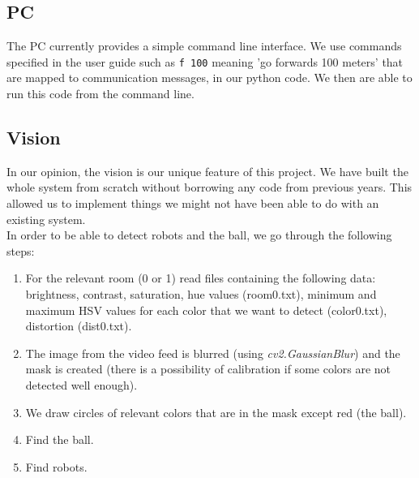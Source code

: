 \documentclass[12pt]{article}
\begin{document}
\subsection{PC}

The PC currently provides a simple command line interface. We use commands specified in the user guide such as \texttt{f 100} meaning 'go forwards 100 meters' that are mapped to communication messages, in our python code. We then are able to run this code from the command line.  

\subsection{Vision}

In our opinion, the vision is our unique feature of this project. We have built the whole system from scratch without borrowing any code from previous years. This allowed us to implement things we might not have been able to do with an existing system. 
\\In order to be able to detect robots and the ball, we go through the following steps:

\begin{enumerate}
\item For the relevant room (0 or 1) read files containing the following data: brightness, contrast,     saturation, hue values (room0.txt), minimum and maximum HSV values for each color that we want to detect (color0.txt), distortion (dist0.txt). 
\item The image from the video feed is blurred (using \textit{cv2.GaussianBlur}) and the mask is created (there is a possibility of calibration if some colors are not detected well enough).
\item We draw circles of relevant colors that are in the mask except red (the ball).
\item Find the ball.
\item Find robots.
\end{enumerate}
\end{document}
